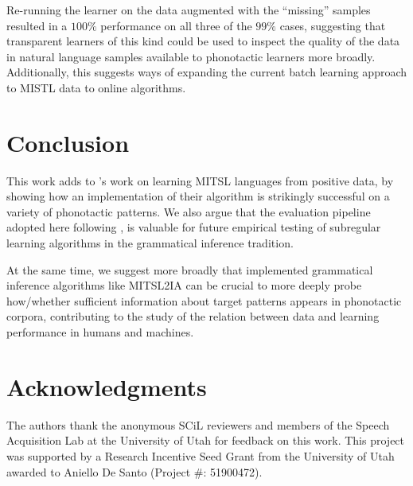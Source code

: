 \documentclass[11pt]{article}
\begin{document}
    Re-running the learner on the data augmented with the ``missing'' samples resulted in a $100\%$ performance on all three of the $99\%$ cases, suggesting that transparent learners of this kind could be used to inspect the quality of the data in natural language samples available to phonotactic learners more broadly.
    Additionally, this suggests ways of expanding the current batch learning approach to MISTL data to online algorithms.
 
 \section{Conclusion}
This work adds to \citet{de2021learning}'s work on learning MITSL languages from positive data, by showing how an implementation of their algorithm is strikingly successful on a variety of phonotactic patterns.
We also argue that the evaluation pipeline adopted here following \citep{aksenova2020tool}, is valuable for future empirical testing of subregular learning algorithms in the grammatical inference tradition.
 
  At the same time, we suggest more broadly that implemented grammatical inference algorithms like MITSL2IA can be crucial to more deeply probe how/whether sufficient information about target patterns appears in phonotactic corpora, contributing to the study of the relation between data and learning performance in humans and machines.

\section*{Acknowledgments}
The authors thank the anonymous SCiL reviewers and  members of the Speech Acquisition Lab at the University of Utah for feedback on this work.
This project was supported by a  Research Incentive Seed Grant from the University of Utah awarded to Aniello De Santo (Project \#: 51900472).





\end{document}
